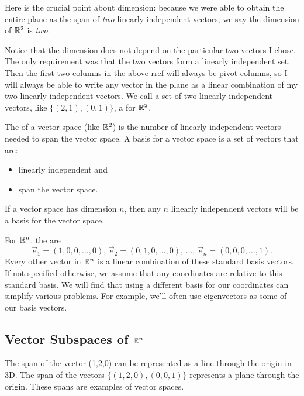 \begin{example}
Here is the crucial point about dimension: because we were able to obtain the entire plane as the span of \emph{two} linearly independent vectors, we say the dimension of $\mathbb{R}^2$ is \emph{two}. 

Notice that the dimension does not depend on the particular two vectors I chose.  The only requirement was that the two vectors form a linearly independent set.  Then the first two columns in the above rref will always be pivot columns, so I will always be able to write any vector in the plane as a linear combination of my two linearly independent vectors.  We call a set of two linearly independent vectors, like $\{(2,1), (0,1)\}$, a  for $\mathbb{R}^2$.
\end{example}

%
The  of a vector space (like $\mathbb{R}^2$) is the number of linearly independent vectors needed to span the vector space.  A basis for a vector space is a set of vectors that are:
\begin{itemize}
\item linearly independent and
\item span the vector space.
\end{itemize}
If a vector space has dimension $n$, then any $n$ linearly independent vectors will be a basis for the vector space.

For $\mathbb{R}^n$, the  are 
$$\vec e_1=(1,0,0,\ldots,0),\,
\vec e_2=(0,1,0,\ldots,0),\,\ldots,\,
\vec e_n=(0,0,0,\ldots,1).$$ 
Every other vector in $\mathbb{R}^n$ is a linear combination of these standard basis vectors.  If not specified otherwise, we assume that any coordinates are relative to this standard basis.  We will find that using a different basis for our coordinates can simplify various problems.  For example, we'll often use eigenvectors as some of our basis vectors.

 

\subsection{Vector Subspaces of ${\mathbb{R}}^n$}

The span of the vector (1,2,0) can be represented as a line through the origin in 3D.  The span of the vectors $\{(1,2,0), (0,0,1)\}$ represents a plane through the origin.  These spans are examples of vector spaces.  

